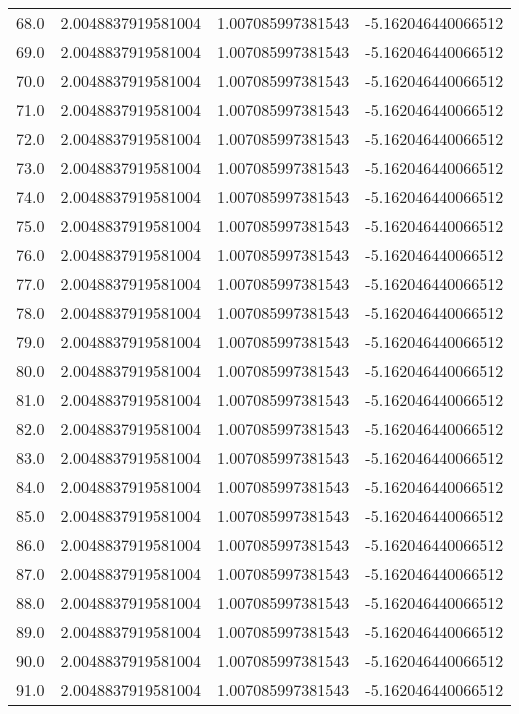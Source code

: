 \begin{longtable}{lrrr}
68.0 & 2.0048837919581004 & 1.007085997381543 & -5.162046440066512 \\
69.0 & 2.0048837919581004 & 1.007085997381543 & -5.162046440066512 \\
70.0 & 2.0048837919581004 & 1.007085997381543 & -5.162046440066512 \\
71.0 & 2.0048837919581004 & 1.007085997381543 & -5.162046440066512 \\
72.0 & 2.0048837919581004 & 1.007085997381543 & -5.162046440066512 \\
73.0 & 2.0048837919581004 & 1.007085997381543 & -5.162046440066512 \\
74.0 & 2.0048837919581004 & 1.007085997381543 & -5.162046440066512 \\
75.0 & 2.0048837919581004 & 1.007085997381543 & -5.162046440066512 \\
76.0 & 2.0048837919581004 & 1.007085997381543 & -5.162046440066512 \\
77.0 & 2.0048837919581004 & 1.007085997381543 & -5.162046440066512 \\
78.0 & 2.0048837919581004 & 1.007085997381543 & -5.162046440066512 \\
79.0 & 2.0048837919581004 & 1.007085997381543 & -5.162046440066512 \\
80.0 & 2.0048837919581004 & 1.007085997381543 & -5.162046440066512 \\
81.0 & 2.0048837919581004 & 1.007085997381543 & -5.162046440066512 \\
82.0 & 2.0048837919581004 & 1.007085997381543 & -5.162046440066512 \\
83.0 & 2.0048837919581004 & 1.007085997381543 & -5.162046440066512 \\
84.0 & 2.0048837919581004 & 1.007085997381543 & -5.162046440066512 \\
85.0 & 2.0048837919581004 & 1.007085997381543 & -5.162046440066512 \\
86.0 & 2.0048837919581004 & 1.007085997381543 & -5.162046440066512 \\
87.0 & 2.0048837919581004 & 1.007085997381543 & -5.162046440066512 \\
88.0 & 2.0048837919581004 & 1.007085997381543 & -5.162046440066512 \\
89.0 & 2.0048837919581004 & 1.007085997381543 & -5.162046440066512 \\
90.0 & 2.0048837919581004 & 1.007085997381543 & -5.162046440066512 \\
91.0 & 2.0048837919581004 & 1.007085997381543 & -5.162046440066512 \\

\end{longtable}
